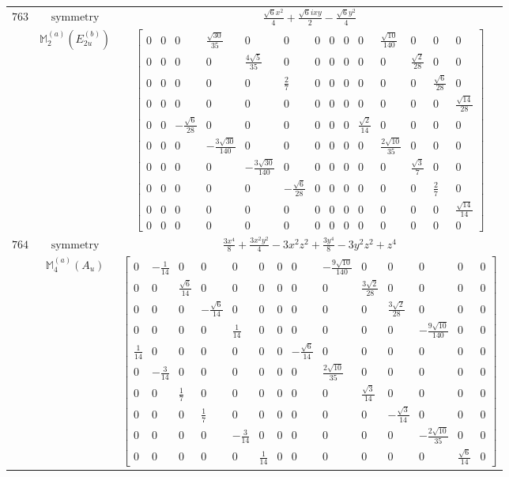 \documentclass[fleqn,8pt,landscape]{jsarticle}
\begin{document}
\begin{longtable}{ccc}
$ 763 $ & $ \text{symmetry} $ & $ \frac{\sqrt{6} x^{2}}{4} + \frac{\sqrt{6} i x y}{2} - \frac{\sqrt{6} y^{2}}{4} $ \\
$  $ & $ \mathbb{M}_{2}^{(a)}(E_{2u}^{(b)}) $ & $ \begin{bmatrix} 0 & 0 & 0 & \frac{\sqrt{30}}{35} & 0 & 0 & 0 & 0 & 0 & 0 & \frac{\sqrt{10}}{140} & 0 & 0 & 0 \\ 0 & 0 & 0 & 0 & \frac{4 \sqrt{5}}{35} & 0 & 0 & 0 & 0 & 0 & 0 & \frac{\sqrt{2}}{28} & 0 & 0 \\ 0 & 0 & 0 & 0 & 0 & \frac{2}{7} & 0 & 0 & 0 & 0 & 0 & 0 & \frac{\sqrt{6}}{28} & 0 \\ 0 & 0 & 0 & 0 & 0 & 0 & 0 & 0 & 0 & 0 & 0 & 0 & 0 & \frac{\sqrt{14}}{28} \\ 0 & 0 & - \frac{\sqrt{6}}{28} & 0 & 0 & 0 & 0 & 0 & 0 & \frac{\sqrt{2}}{14} & 0 & 0 & 0 & 0 \\ 0 & 0 & 0 & - \frac{3 \sqrt{30}}{140} & 0 & 0 & 0 & 0 & 0 & 0 & \frac{2 \sqrt{10}}{35} & 0 & 0 & 0 \\ 0 & 0 & 0 & 0 & - \frac{3 \sqrt{30}}{140} & 0 & 0 & 0 & 0 & 0 & 0 & \frac{\sqrt{3}}{7} & 0 & 0 \\ 0 & 0 & 0 & 0 & 0 & - \frac{\sqrt{6}}{28} & 0 & 0 & 0 & 0 & 0 & 0 & \frac{2}{7} & 0 \\ 0 & 0 & 0 & 0 & 0 & 0 & 0 & 0 & 0 & 0 & 0 & 0 & 0 & \frac{\sqrt{14}}{14} \\ 0 & 0 & 0 & 0 & 0 & 0 & 0 & 0 & 0 & 0 & 0 & 0 & 0 & 0 \end{bmatrix} $ \\ \hline
$ 764 $ & $ \text{symmetry} $ & $ \frac{3 x^{4}}{8} + \frac{3 x^{2} y^{2}}{4} - 3 x^{2} z^{2} + \frac{3 y^{4}}{8} - 3 y^{2} z^{2} + z^{4} $ \\
$  $ & $ \mathbb{M}_{4}^{(a)}(A_{u}) $ & $ \begin{bmatrix} 0 & - \frac{1}{14} & 0 & 0 & 0 & 0 & 0 & 0 & - \frac{9 \sqrt{10}}{140} & 0 & 0 & 0 & 0 & 0 \\ 0 & 0 & \frac{\sqrt{6}}{14} & 0 & 0 & 0 & 0 & 0 & 0 & \frac{3 \sqrt{2}}{28} & 0 & 0 & 0 & 0 \\ 0 & 0 & 0 & - \frac{\sqrt{6}}{14} & 0 & 0 & 0 & 0 & 0 & 0 & \frac{3 \sqrt{2}}{28} & 0 & 0 & 0 \\ 0 & 0 & 0 & 0 & \frac{1}{14} & 0 & 0 & 0 & 0 & 0 & 0 & - \frac{9 \sqrt{10}}{140} & 0 & 0 \\ \frac{1}{14} & 0 & 0 & 0 & 0 & 0 & 0 & - \frac{\sqrt{6}}{14} & 0 & 0 & 0 & 0 & 0 & 0 \\ 0 & - \frac{3}{14} & 0 & 0 & 0 & 0 & 0 & 0 & \frac{2 \sqrt{10}}{35} & 0 & 0 & 0 & 0 & 0 \\ 0 & 0 & \frac{1}{7} & 0 & 0 & 0 & 0 & 0 & 0 & \frac{\sqrt{3}}{14} & 0 & 0 & 0 & 0 \\ 0 & 0 & 0 & \frac{1}{7} & 0 & 0 & 0 & 0 & 0 & 0 & - \frac{\sqrt{3}}{14} & 0 & 0 & 0 \\ 0 & 0 & 0 & 0 & - \frac{3}{14} & 0 & 0 & 0 & 0 & 0 & 0 & - \frac{2 \sqrt{10}}{35} & 0 & 0 \\ 0 & 0 & 0 & 0 & 0 & \frac{1}{14} & 0 & 0 & 0 & 0 & 0 & 0 & \frac{\sqrt{6}}{14} & 0 \end{bmatrix} $ \\ \hline

\end{longtable}
\end{document}
